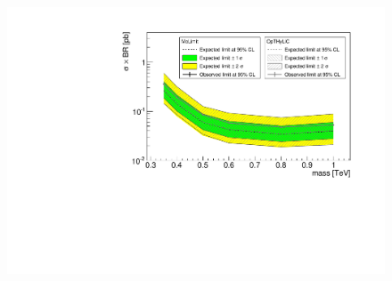 \begin{frame}
\begin{columns}
\begin{column}{0.5\textwidth}
\begin{figure}[!htb]
\begin{center}
\includegraphics[width=1\textwidth]{Figures/Stat/ExclusionPlot_Sgluon.pdf}
\end{center}
\end{figure}
\end{column}

\end{columns}
\end{frame}

